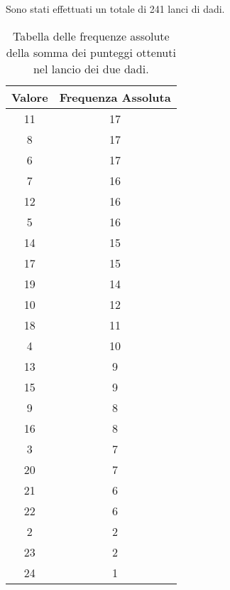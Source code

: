 Sono stati effettuati un totale di 241 lanci di dadi. 

\begin{table}[H]
	\centering
	\begin{tabular}{|c|c|}
		\hline
		\textbf{Valore} & \textbf{Frequenza Assoluta} \\
		\hline
		11 & 17 \\
		\hline
		8 & 17 \\
		\hline
		6 & 17 \\
		\hline
		7 & 16 \\
		\hline
		12 & 16 \\
		\hline
		5 & 16 \\
		\hline
		14 & 15 \\
		\hline
		17 & 15 \\
		\hline
		19 & 14 \\
		\hline
		10 & 12 \\
		\hline
		18 & 11 \\
		\hline
		4 & 10 \\
		\hline
		13 & 9 \\
		\hline
		15 & 9 \\
		\hline
		9 & 8 \\
		\hline
		16 & 8 \\
		\hline
		3 & 7 \\
		\hline
		20 & 7 \\
		\hline
		21 & 6 \\
		\hline
		22 & 6 \\
		\hline
		2 & 2 \\
		\hline
		23 & 2 \\
		\hline
		24 & 1 \\
		\hline
	\end{tabular}
	\caption{Tabella delle frequenze assolute della somma dei punteggi ottenuti nel lancio dei due dadi.}
	\label{tab:frequenze_assolute}
\end{table}